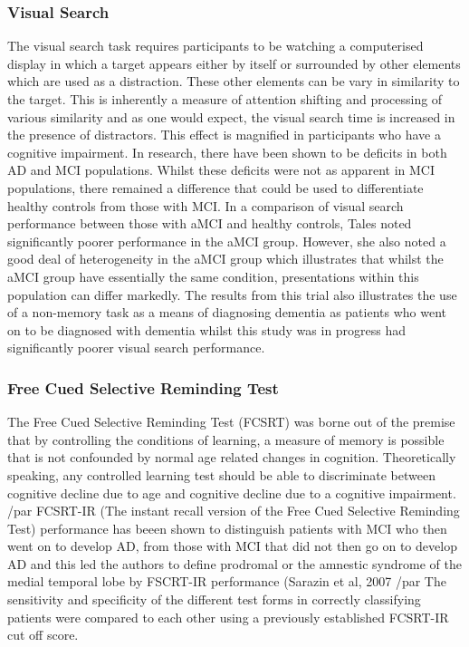 \documentclass{article}
\begin{document}
\subsubsection{Visual Search}
The visual search task requires participants to be watching a computerised display in which a target appears either by itself or surrounded by other elements which are used as a distraction. These other elements can be vary in similarity to the target. This is inherently a measure of attention shifting and processing of various similarity and as one would expect, the visual search time is increased in the presence of distractors. This effect is magnified in participants who have a cognitive impairment. 
In research, there have been shown to be deficits in both AD and MCI populations. Whilst these deficits were not as apparent in MCI populations, there remained a difference that could be used to differentiate healthy controls from those with MCI.
In a comparison of visual search performance between those with aMCI and healthy controls, Tales noted significantly poorer performance in the aMCI group. However, she also noted a good deal of heterogeneity in the aMCI group which illustrates that whilst the aMCI group have essentially the same condition, presentations within this population can differ markedly. The results from this trial also illustrates the use of a non-memory task as a means of diagnosing dementia as patients who went on to be diagnosed with dementia whilst this study was in progress had significantly poorer visual search performance.  
\subsubsection{Free Cued Selective Reminding Test}
The Free Cued Selective Reminding Test (FCSRT) was borne out of the premise that by controlling the conditions of learning, a measure of memory is possible that is not confounded by normal age related changes in cognition. Theoretically speaking, any controlled learning test should be able to discriminate between cognitive decline due to age and cognitive decline due to a cognitive impairment.
/par
FCSRT-IR (The instant recall version of the Free Cued Selective Reminding Test) performance has beeen shown to distinguish patients with MCI who then went on to develop AD, from those with MCI that did not then go on to develop AD and this led the authors to define prodromal or the amnestic syndrome of the medial temporal lobe by FSCRT-IR performance (Sarazin et al, 2007 
/par
The sensitivity and specificity of the different test forms in correctly classifying patients were compared to each other using a previously established FCSRT-IR cut off score. 
\end{document}
